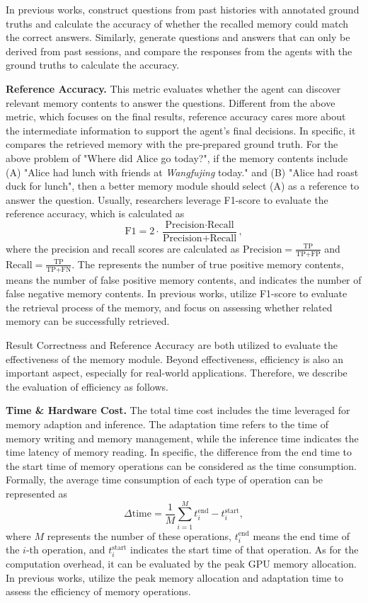 \documentclass{article}
\theoremstyle{definition}
\theoremstyle{theorem}
\theoremstyle{proof}
\theoremstyle{remark}
\begin{document}
	In previous works, \citet{chatdb} construct questions from past histories with annotated ground truths and calculate the accuracy of whether the recalled memory could match the correct answers. Similarly, \citet{memgpt} generate questions and answers that can only be derived from past sessions, and compare the responses from the agents with the ground truths to calculate the accuracy.
	
	\textbf{Reference Accuracy.} This metric evaluates whether the agent can discover relevant memory contents to answer the questions. 
	Different from the above metric, which focuses on the final results, reference accuracy cares more about the intermediate information to support the agent's final decisions. In specific, it compares the retrieved memory with the pre-prepared ground truth.
	For the above problem of "Where did Alice go today?", if the memory contents include (A) "Alice had lunch with friends at \textit{Wangfujing} today." and (B) "Alice had roast duck for lunch", then a better memory module should select (A) as a reference to answer the question.
	Usually, researchers leverage F1-score to evaluate the reference accuracy, which is calculated as
	$$
	\text{F1} = 2 \cdot \frac{\text{Precision} \cdot \text{Recall}}{\text{Precision} + \text{Recall}},
	$$
	where the precision and recall scores are calculated as
	$\text{Precision} = \frac{\text{TP}}{\text{TP}+\text{FP}}$ and $\text{Recall} = \frac{\text{TP}}{\text{TP}+\text{FN}}$. The  represents the number of true positive memory contents,  means the number of false positive memory contents, and  indicates the number of false negative memory contents.
	In previous works, \citet{memochat} utilize F1-score to evaluate the retrieval process of the memory, and \citet{memorybank} focus on assessing whether related memory can be successfully retrieved.
	
	Result Correctness and Reference Accuracy are both utilized to evaluate the effectiveness of the memory module. Beyond effectiveness, efficiency is also an important aspect, especially for real-world applications.
	Therefore, we describe the evaluation of efficiency as follows.
	
	\textbf{Time \& Hardware Cost.} 
	The total time cost includes the time leveraged for memory adaption and inference.
	The adaptation time refers to the time of memory writing and memory management, while the inference time indicates the time latency of memory reading. In specific, the difference from the end time to the start time of memory operations can be considered as the time consumption.
	Formally, the average time consumption of each type of operation can be represented as
	$$
	\Delta \text{time} = \frac{1}{M} \sum_{i=1}^M t_i^{\text{end}} - t_i^{\text{start}},
	$$
	where $M$ represents the number of these operations, $t_i^{\text{end}}$ means the end time of the $i$-th operation, and $t_i^{\text{start}}$ indicates the start time of that operation. As for the computation overhead, it can be evaluated by the peak GPU memory allocation. In previous works, \citet{mac} utilize the peak memory allocation and adaptation time to assess the efficiency of memory operations. 
	
\end{document}
